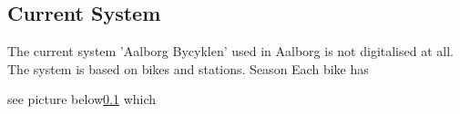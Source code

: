 \subsection{Current System}
The current system 'Aalborg Bycyklen' used in Aalborg is not digitalised at all.
The system is based on bikes and stations.
Season
Each bike has


 see picture below\cref{} which 